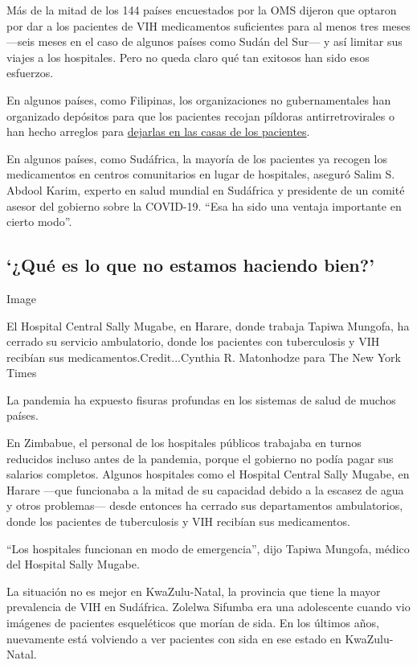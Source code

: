 Más de la mitad de los 144 países encuestados por la OMS dijeron que
optaron por dar a los pacientes de VIH medicamentos suficientes para al
menos tres meses ---seis meses en el caso de algunos países como Sudán
del Sur--- y así limitar sus viajes a los hospitales. Pero no queda
claro qué tan exitosos han sido esos esfuerzos.

En algunos países, como Filipinas, los organizaciones no gubernamentales
han organizado depósitos para que los pacientes recojan píldoras
antirretrovirales o han hecho arreglos para
\href{https://www.unaids.org/en/resources/presscentre/featurestories/2020/april/20200408_philippines}{dejarlas
en las casas de los pacientes}.

En algunos países, como Sudáfrica, la mayoría de los pacientes ya
recogen los medicamentos en centros comunitarios en lugar de hospitales,
aseguró Salim S. Abdool Karim, experto en salud mundial en Sudáfrica y
presidente de un comité asesor del gobierno sobre la COVID-19. ``Esa ha
sido una ventaja importante en cierto modo''.

\hypertarget{quuxe9-es-lo-que-no-estamos-haciendo-bien}{%
\subsection{`¿Qué es lo que no estamos haciendo
bien?'}\label{quuxe9-es-lo-que-no-estamos-haciendo-bien}}

Image

El Hospital Central Sally Mugabe, en Harare, donde trabaja Tapiwa
Mungofa, ha cerrado su servicio ambulatorio, donde los pacientes con
tuberculosis y VIH recibían sus medicamentos.Credit...Cynthia R.
Matonhodze para The New York Times

La pandemia ha expuesto fisuras profundas en los sistemas de salud de
muchos países.

En Zimbabue, el personal de los hospitales públicos trabajaba en turnos
reducidos incluso antes de la pandemia, porque el gobierno no podía
pagar sus salarios completos. Algunos hospitales como el Hospital
Central Sally Mugabe, en Harare ---que funcionaba a la mitad de su
capacidad debido a la escasez de agua y otros problemas--- desde
entonces ha cerrado sus departamentos ambulatorios, donde los pacientes
de tuberculosis y VIH recibían sus medicamentos.

``Los hospitales funcionan en modo de emergencia'', dijo Tapiwa Mungofa,
médico del Hospital Sally Mugabe.

La situación no es mejor en KwaZulu-Natal, la provincia que tiene la
mayor prevalencia de VIH en Sudáfrica. Zolelwa Sifumba era una
adolescente cuando vio imágenes de pacientes esqueléticos que morían de
sida. En los últimos años, nuevamente está volviendo a ver pacientes con
sida en ese estado en KwaZulu-Natal.

